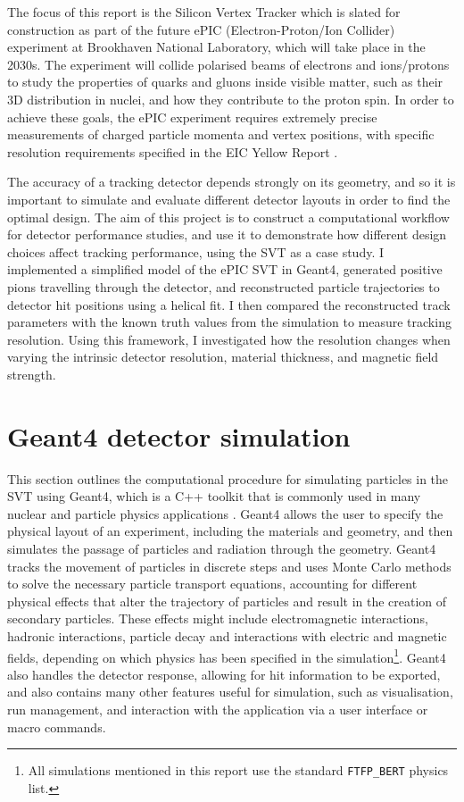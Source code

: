 \documentclass[titlepage]{article}[11pt]
\begin{document}
The focus of this report is the Silicon Vertex Tracker which is slated for construction as part of the future ePIC (Electron-Proton/Ion Collider) experiment at Brookhaven National Laboratory, which will take place in the 2030s. The experiment will collide polarised beams of electrons and ions/protons to study the properties of quarks and gluons inside visible matter, such as their 3D distribution in nuclei, and how they contribute to the proton spin. In order to achieve these goals, the ePIC experiment requires extremely precise measurements of charged particle momenta and vertex positions, with specific resolution requirements specified in the EIC Yellow Report \cite{ABDULKHALEK2022122447}. 

The accuracy of a tracking detector depends strongly on its geometry, and so it is important to simulate and evaluate different detector layouts in order to find the optimal design. The aim of this project is to construct a computational workflow for detector performance studies, and use it to demonstrate how different design choices affect tracking performance, using the SVT as a case study. I implemented a simplified model of the ePIC SVT in Geant4, generated positive pions travelling through the detector, and reconstructed particle trajectories to detector hit positions using a helical fit. I then compared the reconstructed track parameters with the known truth values from the simulation to measure tracking resolution. Using this framework, I investigated how the resolution changes when varying the intrinsic detector resolution, material thickness, and magnetic field strength.

\section{Geant4 detector simulation} \label{Method}

This section outlines the computational procedure for simulating particles in the SVT using Geant4, which is a C++ toolkit that is commonly used in many nuclear and particle physics applications \cite{Geant4}. Geant4 allows the user to specify the physical layout of an experiment, including the materials and geometry, and then simulates the passage of particles and radiation through the geometry. Geant4 tracks the movement of particles in discrete steps and uses Monte Carlo methods to solve the necessary particle transport equations, accounting for different physical effects that alter the trajectory of particles and result in the creation of secondary particles. These effects might include electromagnetic interactions, hadronic interactions, particle decay and interactions with electric and magnetic fields, depending on which physics has been specified in the simulation\footnote[1]{
	All simulations mentioned in this report use the standard \texttt{FTFP\_BERT} physics list.
}. Geant4 also handles the detector response, allowing for hit information to be exported, and also contains many other features useful for simulation, such as visualisation, run management, and interaction with the application via a user interface or macro commands. 
\end{document}
